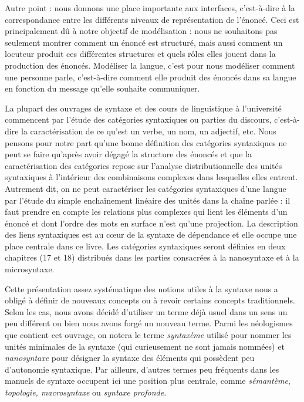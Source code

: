 Autre point : nous donnons une place importante aux interfaces, c’est-à-dire à la correspondance entre les différents niveaux de représentation de l’énoncé. Ceci est principalement dû à notre objectif de modélisation : nous ne souhaitons pas seulement montrer comment un énoncé est structuré, mais aussi comment un locuteur produit ces différentes structures et quels rôles elles jouent dans la production des énoncés. Modéliser la langue, c’est pour nous modéliser comment une personne parle, c’est-à-dire comment elle produit des énoncés dans sa langue en fonction du message qu’elle souhaite communiquer.

La plupart des ouvrages de syntaxe et des cours de linguistique à l’université commencent par l’étude des catégories syntaxiques ou parties du discours, c’est-à-dire la caractérisation de ce qu’est un verbe, un nom, un adjectif, etc. Nous pensons pour notre part qu’une bonne définition des catégories syntaxiques ne peut se faire qu’après avoir dégagé la structure des énoncés et que la caractérisation des catégories repose sur l’analyse distributionnelle des unités syntaxiques à l’intérieur des combinaisons complexes dans lesquelles elles entrent. Autrement dit, on ne peut caractériser les catégories syntaxiques d’une langue par l’étude du simple enchaînement linéaire des unités dans la chaîne parlée : il faut prendre en compte les relations plus complexes qui lient les éléments d’un énoncé et dont l’ordre des mots en surface n’est qu’une projection. La description des liens syntaxiques est au cœur de la syntaxe de dépendance et elle occupe une place centrale dans ce livre. Les catégories syntaxiques seront définies en deux chapitres (17 et 18)
distribués dans les parties consacrées à la nanosyntaxe et à la microsyntaxe.

Cette présentation assez systématique des notions utiles à la syntaxe nous a obligé à définir de nouveaux concepts ou à revoir certains concepts traditionnels. Selon les cas, nous avons décidé d’utiliser un terme déjà usuel dans un sens un peu différent ou bien nous avons forgé un nouveau terme. Parmi les néologismes que contient cet ouvrage, on notera le terme \textit{syntaxème} utilisé pour nommer les unités minimales de la syntaxe (qui curieusement ne sont jamais nommées) et \textit{nanosyntaxe} pour désigner la syntaxe des éléments qui possèdent peu d’autonomie syntaxique. Par ailleurs, d’autres termes peu fréquents dans les manuels de syntaxe occupent ici une position plus centrale, comme \textit{sémantème}, \textit{topologie, macrosyntaxe} ou \textit{syntaxe profonde}.

